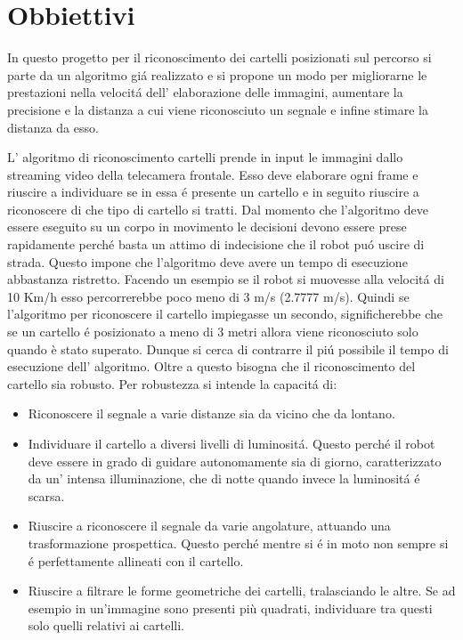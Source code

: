 \section{Obbiettivi}

	In questo progetto per il riconoscimento dei cartelli posizionati sul percorso si parte da un algoritmo gi\'a realizzato e si propone un modo per migliorarne le prestazioni nella velocit\'a dell' elaborazione delle immagini, aumentare la precisione e la distanza a cui viene riconosciuto un segnale e infine stimare la distanza da esso.
	
	L' algoritmo di riconoscimento cartelli prende in input le immagini dallo streaming video della telecamera frontale. Esso deve elaborare ogni frame e riuscire a individuare se in essa \'e presente un cartello e in seguito riuscire a riconoscere di che tipo di cartello si tratti. Dal momento che l'algoritmo deve essere eseguito su un corpo in movimento le decisioni devono essere prese rapidamente perch\'e basta un attimo di indecisione che il robot pu\'o uscire di strada. Questo impone che l'algoritmo deve avere un tempo di esecuzione abbastanza ristretto. Facendo un esempio se il robot si muovesse alla velocit\'a di 10 Km/h esso percorrerebbe poco meno di 3 m/s (2.7777 m/s). Quindi se l'algoritmo per riconoscere il cartello impiegasse un secondo, significherebbe che se un cartello \'e posizionato a meno di 3 metri allora viene riconosciuto solo quando è stato superato. Dunque si cerca di contrarre il pi\'u possibile il tempo di esecuzione dell' algoritmo. Oltre a questo bisogna che il riconoscimento del cartello sia robusto. Per robustezza si intende la capacit\'a di:
		\begin{itemize}
		\item Riconoscere il segnale a varie distanze sia da vicino che da lontano.
		\item Individuare il cartello a diversi livelli di luminosit\'a. Questo perch\'e il robot deve essere in grado di guidare autonomamente sia di giorno, caratterizzato da un' intensa illuminazione, che di notte quando invece la luminosit\'a \'e scarsa.
		\item Riuscire a riconoscere il segnale da varie angolature, attuando una trasformazione prospettica. Questo perch\'e mentre si \'e in moto non sempre si \'e perfettamente allineati con il cartello. 
		\item Riuscire a filtrare le forme geometriche dei cartelli, tralasciando le altre. Se ad esempio in un'immagine sono presenti più quadrati, individuare tra questi solo quelli relativi ai cartelli.
	\end{itemize}

